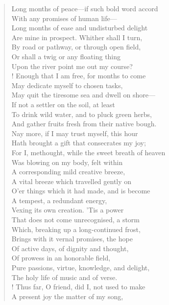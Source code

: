 \begin{verse}
Long months of peace---if such bold word accord  \\
With any promises of human life---  \\
Long months of ease and undisturbed delight  \\
Are mine in prospect. Whither shall I turn,  \\
By road or pathway, or through open field,	  \\
Or shall a twig or any floating thing  \\
Upon the river point me out my course?  \\!
Enough that I am free, for months to come  \\
May dedicate myself to chosen tasks,  \\
May quit the tiresome sea and dwell on shore---	  \\
If not a settler on the soil, at least  \\
To drink wild water, and to pluck green herbs,  \\
And gather fruits fresh from their native bough.  \\
Nay more, if I may trust myself, this hour  \\
Hath brought a gift that consecrates my joy;	  \\
For I, methought, while the sweet breath of heaven  \\
Was blowing on my body, felt within  \\
A corresponding mild creative breeze,  \\
A vital breeze which travelled gently on  \\
O'er things which it had made, and is become	  \\
A tempest, a redundant energy,  \\
Vexing its own creation. 'Tis a power  \\
That does not come unrecognised, a storm  \\
Which, breaking up a long-continued frost,  \\
Brings with it vernal promises, the hope	  \\
Of active days, of dignity and thought,  \\
Of prowess in an honorable field,  \\
Pure passions, virtue, knowledge, and delight,  \\
The holy life of music and of verse.  \\!
Thus far, O friend, did I, not used to make	  \\
A present joy the matter of my song,  \\

\end{verse}
